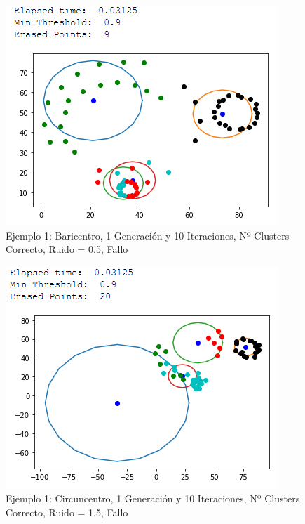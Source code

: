 \documentclass[conference,a4paper]{IEEEtran}
\begin{document}
\begin{figure}[H]
\centering
\includegraphics[scale=0.65]{Experimentacion/Ejemplo1/ej1_b_1_10_lr}
\caption{Ejemplo 1: Baricentro, 1 Generación y 10 Iteraciones,  Nº Clusters Correcto, Ruido = 0.5, Fallo\\}
\end{figure}

\begin{figure}[H]
\centering
\includegraphics[scale=0.65]{Experimentacion/Ejemplo1/ej1_c_1_10_mr}
\caption{Ejemplo 1: Circuncentro, 1 Generación y 10 Iteraciones,  Nº Clusters Correcto, Ruido = 1.5, Fallo\\}
\end{figure}
\end{document}
